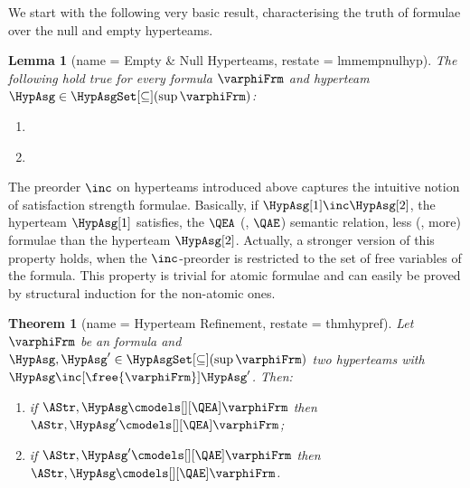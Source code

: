 \documentclass[authoryear]{elsarticle}
\newtheorem{lemma}{Lemma}
\newtheorem{theorem}{Theorem}
\newcommand{\EmpTeamAsg}{\emptyset}
\newcommand{\EmpHypAsg}{\emptyset}
\begin{document}
We start with the following very basic result, characterising the truth of
formulae over the null and empty hyperteams.

\begin{lemma}[name = Empty \& Null Hyperteams, restate = lmmempnulhyp]
  \label{lmm:empnulhyp}
  The following hold true for every \ADIF formula $\varphiFrm$ and hyperteam
  $\HypAsg \in \HypAsgSet[\subseteq](\sup{\varphiFrm})$:
  \begin{enumerate}[1)]
    \item\label{lmm:empnulhyp(ea)}
    \item\label{lmm:empnulhyp(ae)}
  \end{enumerate}
\end{lemma}

The preorder $\inc$ on hyperteams introduced above captures
the intuitive notion of satisfaction strength \wrt \ADIF formulae.
Basically, if $\HypAsg[1] \inc \HypAsg[2]$, the hyperteam $\HypAsg[1]$
satisfies, \wrt the $\QEA$ (\resp, $\QAE$) semantic relation, less (\resp, more)
formulae than the hyperteam $\HypAsg[2]$.
Actually, a stronger version of this property holds, when the $\inc$-preorder is
restricted to the set of free variables of the formula.
This property is trivial for atomic formulae and can easily be proved by
structural induction for the non-atomic ones.

\begin{theorem}[name = Hyperteam Refinement, restate = thmhypref]
  \label{thm:hypref}
  Let $\varphiFrm$ be an \ADIF formula and $\HypAsg, \HypAsg' \in
  \HypAsgSet[\subseteq](\sup{\varphiFrm})$ two hyperteams with ${\HypAsg
  \inc[\free{\varphiFrm}] \HypAsg'}$.
  Then:
  \begin{enumerate}[1)]
    \item\label{thm:hypref(ea)}
      if $\AStr, \HypAsg \cmodels[][\QEA] \varphiFrm$ then $\AStr, \HypAsg'
      \cmodels[][\QEA] \varphiFrm$;
    \item\label{thm:hypref(ae)}
      if $\AStr, \HypAsg' \cmodels[][\QAE] \varphiFrm$ then $\AStr, \HypAsg
      \cmodels[][\QAE] \varphiFrm$.
  \end{enumerate}
\end{theorem}
\end{document}
